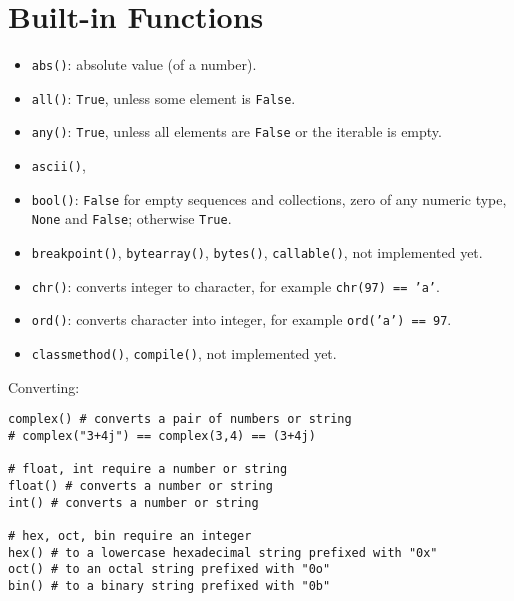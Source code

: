 \section{Built-in Functions}
\begin{itemize}

\item \texttt{abs()}: absolute value (of a number).

\item \texttt{all()}: \texttt{True}, unless some element is \texttt{False}.

\item \texttt{any()}: \texttt{True}, unless all elements are \texttt{False} or the iterable is empty.

\item
\texttt{ascii()},

\item \texttt{bool()}: \texttt{False} for empty sequences and collections, zero of any numeric type, \texttt{None} and \texttt{False}; otherwise \texttt{True}.

\item
\texttt{breakpoint()},
\texttt{bytearray()},
\texttt{bytes()},
\texttt{callable()},
\dotfill not implemented yet.

\item \texttt{chr()}: converts integer to character, for example \texttt{chr(97) == 'a'}.

\item \texttt{ord()}: converts character into integer, for example \texttt{ord('a') == 97}.

\item
\texttt{classmethod()},
\texttt{compile()},
\dotfill not implemented yet.
\end{itemize}

Converting:
\begin{verbatim}
complex() # converts a pair of numbers or string
# complex("3+4j") == complex(3,4) == (3+4j)

# float, int require a number or string
float() # converts a number or string
int() # converts a number or string

# hex, oct, bin require an integer
hex() # to a lowercase hexadecimal string prefixed with "0x"
oct() # to an octal string prefixed with "0o"
bin() # to a binary string prefixed with "0b"
\end{verbatim}

